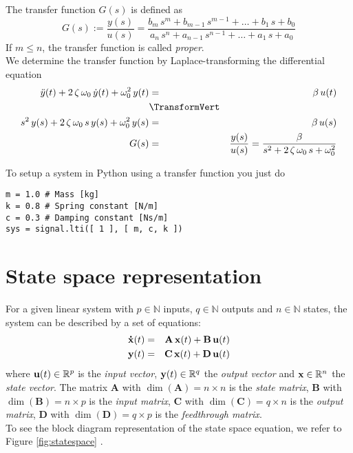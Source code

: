 \documentclass[a4paper,12pt]{article}
\newcommand{\FigRef}[1]{%
	Figure \ref{fig:#1}%
	}
\renewcommand{\Vec}[1]{{\bf #1}}
\newcommand{\Mat}[1]{\mathbf{#1}}
\newcommand{\Section}[2]{\section{#2}\label{section:#1}}
\begin{document}
The transfer function $G(s)$ is defined as
\begin{equation}
G(s):=\frac{y(s)}{u(s)}=\frac{b_{m}\,s^{m}+b_{m-1}\,s^{m-1}+\ldots+b_{1}\,s+b_{0}}{a_{n}\,s^{n}+a_{n-1}\,s^{n-1}+\ldots+a_{1}\,s+a_{0}}
\end{equation}
If $m\leq n$, the transfer function is called {\em proper}.\\

We determine the transfer function by Laplace-transforming the differential equation
\begin{eqnarray}
\ddot{y}(t)+2\,\zeta\,\omega_0\,\dot{y}(t)+\omega_0^2\,y(t)&=&\beta\,u(t)\\
&\TransformVert&\nonumber\\
s^2\,y(s)+2\,\zeta\,\omega_0\,s\,y(s)+\omega_0^2\,y(s)&=&\beta\,u(s)\\
G(s)&=&\frac{y(s)}{u(s)}=\frac{\beta}{s^2+2\,\zeta\,\omega_0\,s+\omega_0^2}
\end{eqnarray}

To setup a system in Python using a transfer function you just do
\begin{verbatim}
m = 1.0 # Mass [kg]
k = 0.8 # Spring constant [N/m]
c = 0.3 # Damping constant [Ns/m]
sys = signal.lti([ 1 ], [ m, c, k ])
\end{verbatim}

\Section{sspace}{State space representation}

For a given linear system with $p\in\mathbb{N}$ inputs, $q\in\mathbb{N}$
outputs and $n\in\mathbb{N}$ states, the system can be described by a set
of equations:
\begin{eqnarray}
\Vec{\dot{x}}(t)&=&\Mat{A}\,\Vec{x}(t)+\Mat{B}\,\Vec{u}(t)\\
\Vec{y}(t)&=&\Mat{C}\,\Vec{x}(t)+\Mat{D}\,\Vec{u}(t)
\end{eqnarray}
where $\Vec{u}(t)\in\mathbb{R}^p$ is the {\em input vector},
$\Vec{y}(t)\in\mathbb{R}^q$ the {\em output vector} and $\Vec{x}\in\mathbb{R}^n$
the {\em state vector}. The matrix $\Mat{A}$ with $\dim(\Mat{A})=n\times n$ is
the {\em state matrix}, $\Mat{B}$ with $\dim(\Mat{B})=n\times p$ is the
{\em input matrix}, $\Mat{C}$ with $\dim(\Mat{C})=q\times n$ is the
{\em output matrix}, $\Mat{D}$ with $\dim(\Mat{D})=q\times p$ is the
{\em feedthrough matrix}.\\

To see the block diagram representation of the state space equation, we refer
to \FigRef{statespace}.\\
\end{document}
